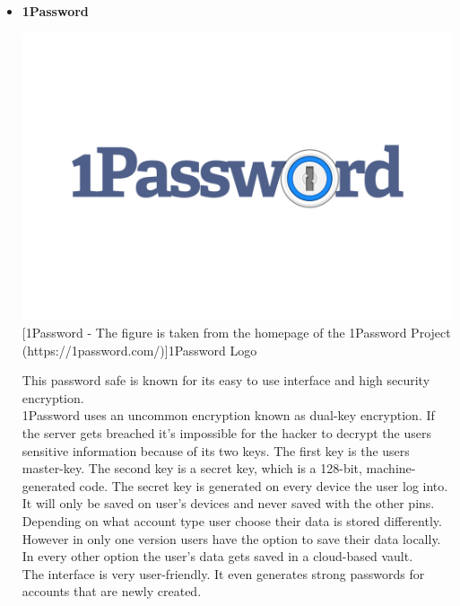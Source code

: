 \documentclass[conference]{IEEEtran}
\begin{document}
\begin{itemize}
\item \textbf{1Password}\cite{b7}\\
\begin{center}
\includegraphics[scale=0.06]{./images/1Password-Logo.wine.png}
[1Password - The figure is taken from the homepage of the 1Password Project (https://1password.com/)]{1Password Logo}
\end{center}
This password safe is known for its easy to use interface and high security encryption.\\ 
1Password uses an uncommon encryption known as dual-key encryption. If the server gets breached it's impossible for the hacker to decrypt the users sensitive information because of its two keys. The first key is the users master-key. The second key is a secret key, which is a 128-bit, machine-generated code. The secret key is generated on every device the user log into. It will only be saved on user's devices and never saved with the other pins.\\
Depending on what account type user choose their data is stored differently. However in only one version users have the option to save their data locally. In every other option the user's data gets saved in a cloud-based vault.\\
The interface is very user-friendly. It even generates strong passwords for accounts that are newly created.

\end{itemize}
\end{document}
